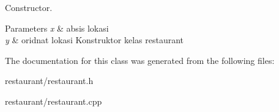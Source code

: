 Constructor. 


\begin{DoxyParams}{Parameters}
{\em x} & absis lokasi \\
\hline
{\em y} & oridnat lokasi Konstruktor kelas restaurant \\
\hline
\end{DoxyParams}


The documentation for this class was generated from the following files\+:\begin{DoxyCompactItemize}
\item 
restaurant/restaurant.\+h\item 
restaurant/restaurant.\+cpp\end{DoxyCompactItemize}
